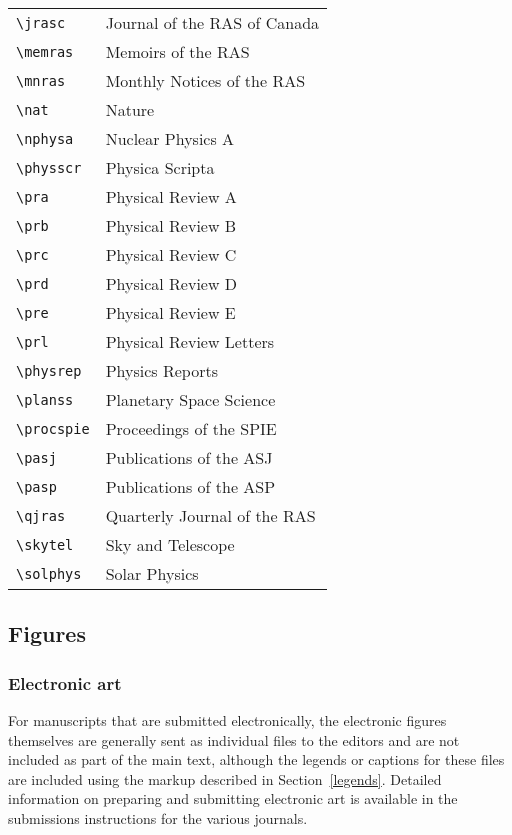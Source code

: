 \documentclass[preprint2]{aastex}
\begin{document}
\begin{table}
\begin{center}
\begin{tabular}{ll}
\verb"\jrasc" & Journal of the RAS of Canada\\ 
\verb"\memras" & Memoirs of the RAS\\ 
\verb"\mnras" & Monthly Notices of the RAS\\ 
\verb"\nat" & Nature\\ 
\verb"\nphysa" & Nuclear Physics A\\ 
\verb"\physscr" & Physica Scripta\\ 
\verb"\pra" & Physical Review A\\ 
\verb"\prb" & Physical Review B\\ 
\verb"\prc" & Physical Review C\\ 
\verb"\prd" & Physical Review D\\ 
\verb"\pre" & Physical Review E\\ 
\verb"\prl" & Physical Review Letters\\ 
\verb"\physrep" & Physics Reports\\ 
\verb"\planss" & Planetary Space Science\\ 
\verb"\procspie" & Proceedings of the SPIE\\ 
\verb"\pasj" & Publications of the ASJ\\ 
\verb"\pasp" & Publications of the ASP\\ 
\verb"\qjras" & Quarterly Journal of the RAS\\ 
\verb"\skytel" & Sky and Telescope\\ 
\verb"\solphys" & Solar Physics\\ 
\end{tabular} 
\end{center} 
\end{table} 
 
\subsection{Figures} 
 
\subsubsection{Electronic art} 
 
For manuscripts that are submitted electronically, the electronic figures 
themselves are generally sent as individual files to the editors 
and are not included as part of the main text, although the 
legends or captions for these files are included using the markup described 
in Section~\ref{legends}. 
Detailed information on preparing and submitting electronic art is 
available in the submissions instructions for the various journals. 
 
\end{document}
